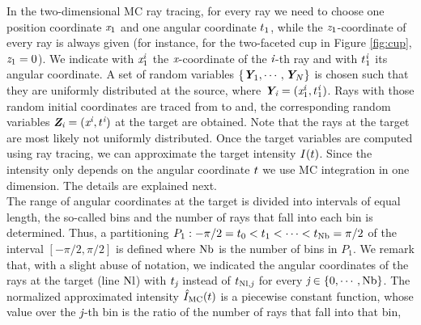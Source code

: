 In the two-dimensional MC ray tracing, for every ray we need to choose one position coordinate $\textit{x}_1$ and one angular coordinate $t_1$, while the $\textit{z}_1$-coordinate of every ray is always given (for instance, for the two-faceted cup in Figure \ref{fig:cup}, $\textit{z}_1=0$). 
We indicate with $\textit{x}_{1}^{\textit{i}}$ the $\textit{x}$-coordinate of the $\textit{i}$-th ray and with $t_1^{\textit{i}}$ its angular coordinate. 
 A set of random variables $\{\textit{\textbf{Y}}_1, \cdots, \textit{\textbf{Y}}_N\}$ is chosen such that they are uniformly distributed at the source, where $\textit{\textbf{Y}}_{\textit{i}}= (\textit{x}_{1}^{\textit{i}},t_1^{\textit{i}})$.
Rays with those random initial coordinates are traced from  to  and, the corresponding random variables $\textit{\textbf{Z}}_{\textit{i}}=(\textit{x}^{\textit{i}},t^{\textit{i}})$ at the target are obtained. Note that the rays at the target are most likely not uniformly distributed. Once the target variables are computed using ray tracing, we can approximate the target intensity $I(t)$. Since the intensity only depends on the angular coordinate $t$ we use MC integration in one dimension. The details are explained next.
\\ \indent The range of angular coordinates at the target is divided into intervals of equal length, the so-called bins and the number of rays that fall into each bin is determined. Thus, a partitioning
$P_1: -\pi/2 = t_{0}<t_{1}<\cdots <t_{\textrm{Nb}}=\pi/2$ of the interval $[-\pi/2, \pi/2]$ is defined where $\textrm{Nb}$ is the number of bins in $P_1$.
We remark that, with a slight abuse of notation, we indicated the angular coordinates of the rays at the target (line $\textrm{Nl}$) with $t_{\textit{j}}$ instead of $t_{\textrm{Nl},\textit{j}}$ for every $\textit{j}\in\{0, \cdots, \textrm{Nb}\}$. 
The normalized approximated intensity $\hat{I}_{\textrm{MC}}(t)$ is a piecewise constant function, whose value over the $\textit{j}$-th bin is the ratio of the number of rays that fall into that bin,
